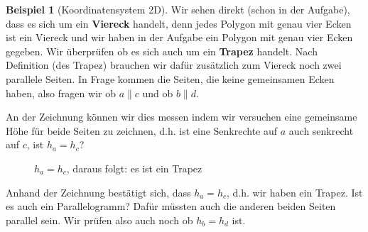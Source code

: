 \documentclass[a4paper]{book}%
\theoremstyle{definition}
\newtheorem{beispiel}{Beispiel}
\begin{document}
\begin{beispiel}[Koordinatensystem 2D]
Wir sehen direkt (schon in der Aufgabe), dass es sich um ein \textbf{Viereck} handelt, denn jedes Polygon mit genau vier Ecken ist ein Viereck und wir haben in der Aufgabe ein Polygon mit genau vier Ecken gegeben. Wir überprüfen ob es sich auch um ein \textbf{Trapez} handelt. Nach Definition (des Trapez) brauchen wir dafür zusätzlich zum Viereck noch zwei parallele Seiten. In Frage kommen die Seiten, die keine gemeinsamen Ecken haben, also fragen wir ob $a \| c$ und ob $b \| d$.

An der Zeichnung können wir dies messen indem wir versuchen eine gemeinsame Höhe für beide Seiten zu zeichnen, d.h. ist eine Senkrechte auf $a$ auch senkrecht auf $c$, ist $h_a = h_c$?

\begin{figure}[ht]
  \centering
  \caption{$h_a = h_c$, daraus folgt: es ist ein Trapez}\label{fig:koordinatensystem2D}
\end{figure}

Anhand der Zeichnung bestätigt sich, dass $h_a=h_c$, d.h. wir haben ein Trapez. Ist es auch ein Parallelogramm? Dafür müssten auch die anderen beiden Seiten parallel sein. Wir prüfen also auch noch ob $h_b = h_d$ ist.

\begin{figure}[ht]
  \centering
\end{figure}
\end{beispiel}
\end{document}
